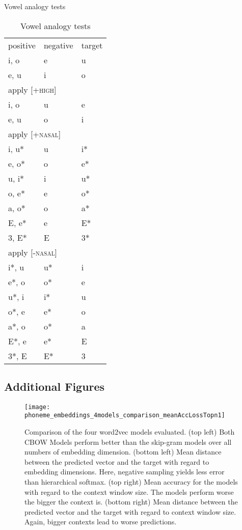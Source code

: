 \documentclass[6pt]{article}
\begin{document}
\caption{Vowel analogy tests}
\begin{longtable}{ l | l | l }
\caption{Vowel analogy tests}
\centering
\hline \multicolumn{3}{l}{apply \textsc{[+rounded]}}\\  \hline
positive & negative & target \\\hline
i, o & e & u \\
e, u & i & o \\
\hline \multicolumn{3}{l}{apply \textsc{[+high]}}\\  \hline
i, o & u & e \\
e, u & o & i \\
\hline \multicolumn{3}{l}{apply \textsc{[+nasal]}}\\  \hline
i, u* & u & i* \\
e, o* & o & e* \\
u, i* & i & u* \\
o, e* & e & o* \\
a, o* & o & a* \\
E, e* & e & E* \\
3, E* & E & 3* \\
\hline \multicolumn{3}{l}{apply \textsc{[-nasal]}}\\  \hline
i*, u & u* & i \\
e*, o & o* & e \\
u*, i & i* & u \\
o*, e & e* & o \\
a*, o & o* & a \\
E*, e & e* & E \\
3*, E & E* & 3 \\
\end{longtable}

\newpage
\subsection{Additional Figures} \label{App:figures}
\begin{figure}[h] %
   \centering
   \texttt{[image: phoneme\_embeddings\_4models\_comparison\_meanAccLossTopn1]} 
   \caption{Comparison of the four word2vec models evaluated. (top left) Both CBOW Models perform better than the skip-gram models over all numbers of embedding dimension. (bottom left) Mean distance between the predicted vector and the target with regard to embedding dimensions. Here, negative sampling yields less error than hierarchical softmax. (top right) Mean accuracy for the models with regard to the context window size. The models perform worse the bigger the context is. (bottom right) Mean distance between the predicted vector and the target with regard to context window size. Again, bigger contexts lead to worse predictions. }
   \label{fig:phoneme_embeddings_4models_comparison_meanAccLossTopn1}
\end{figure}
\end{document}
